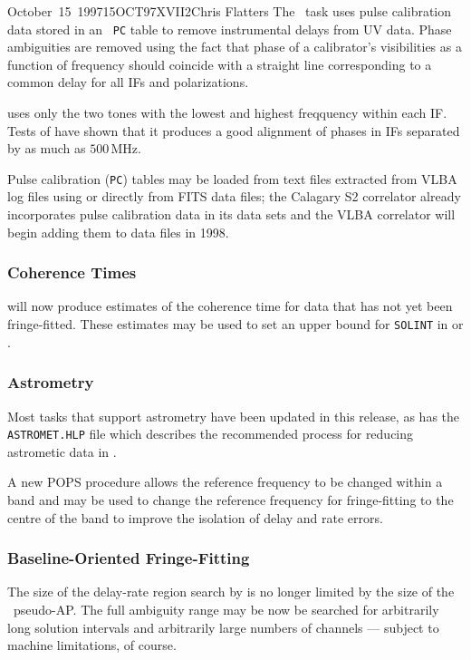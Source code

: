 \documentclass[twoside]{article}
\begin{document}
\begin{aipsletter}{October~15~1997}{15OCT97}{XVII}{2}{Chris Flatters}
The \AIPS\ task  uses pulse calibration data stored in
an \AIPS\ \texttt{PC} table to remove instrumental delays from UV
data. Phase ambiguities are removed using the fact that phase of a
calibrator's visibilities as a function of frequency should coincide
with a straight line corresponding to a common delay for all IFs and
polarizations.

 uses only the two tones with the lowest and highest
freqquency within each IF.  Tests of  have shown that it
produces a good alignment of phases in IFs separated by as much as
$500\,\mathrm{MHz}$.

Pulse calibration (\texttt{PC}) tables may be loaded from text files
extracted from VLBA log files using  or directly from
FITS data files; the Calagary S2 correlator already incorporates pulse
calibration data in its data sets and the VLBA correlator will begin
adding them to data files in 1998.

\subsubsection{Coherence Times}

 will now produce estimates of the coherence time for data
that has not yet been fringe-fitted.  These estimates may be used to
set an upper bound for \texttt{SOLINT} in  or .

\subsubsection{Astrometry}

Most tasks that support astrometry have been updated in this release,
as has the \texttt{ASTROMET.HLP} file which describes the recommended
process for reducing astrometic data in \AIPS.

A new POPS procedure  allows the reference frequency to
be changed within a band and may be used to change the reference
frequency for fringe-fitting to the centre of the band to improve the
isolation of delay and rate errors.

\subsubsection{Baseline-Oriented Fringe-Fitting}

The size of the delay-rate region search by  is no
longer limited by the size of the \AIPS\ pseudo-AP.  The full
ambiguity range may be now be searched for arbitrarily long solution
intervals and arbitrarily large numbers of channels --- subject to
machine limitations, of course.


\end{aipsletter}
\end{document}
